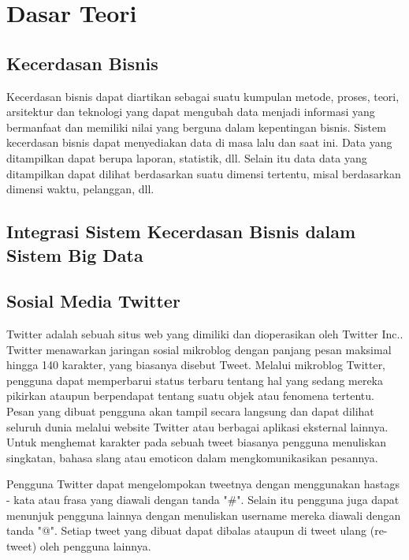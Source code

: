 \chapter{Dasar Teori}
\label{chap:dasar_teori}
	
\section{Kecerdasan Bisnis}
\label{sec:kecerdasan_bisnis}
Kecerdasan bisnis dapat diartikan sebagai suatu kumpulan metode, proses, teori, arsitektur dan teknologi yang dapat mengubah data menjadi informasi yang bermanfaat dan memiliki nilai yang berguna dalam kepentingan bisnis. Sistem kecerdasan bisnis dapat menyediakan data di masa lalu dan saat ini. Data yang ditampilkan dapat berupa laporan, statistik, dll. Selain itu data data yang ditampilkan dapat dilihat berdasarkan suatu dimensi tertentu, misal berdasarkan dimensi waktu, pelanggan, dll.

\section{Integrasi Sistem Kecerdasan Bisnis dalam Sistem Big Data}
\label{sec:integrasi_kecerdasan_bisnis}

\section{Sosial Media Twitter}
\label{sec:twitter}
Twitter adalah sebuah situs web yang dimiliki dan dioperasikan oleh Twitter Inc.. Twitter menawarkan jaringan sosial mikroblog dengan panjang pesan maksimal hingga 140 karakter, yang biasanya disebut Tweet. Melalui mikroblog Twitter, pengguna dapat memperbarui status terbaru tentang hal yang sedang mereka pikirkan ataupun berpendapat tentang suatu objek atau fenomena tertentu. Pesan yang dibuat pengguna akan tampil secara langsung dan dapat dilihat seluruh dunia melalui website Twitter atau berbagai aplikasi eksternal lainnya. Untuk menghemat karakter pada sebuah tweet biasanya pengguna menuliskan singkatan, bahasa slang atau emoticon dalam mengkomunikasikan pesannya. 

Pengguna Twitter dapat mengelompokan tweetnya dengan menggunakan hastags - kata atau frasa yang diawali dengan tanda "\#". Selain itu pengguna juga dapat menunjuk pengguna lainnya dengan menuliskan username mereka diawali dengan tanda "@". Setiap tweet yang dibuat dapat dibalas ataupun di tweet ulang (re-tweet) oleh pengguna lainnya.

